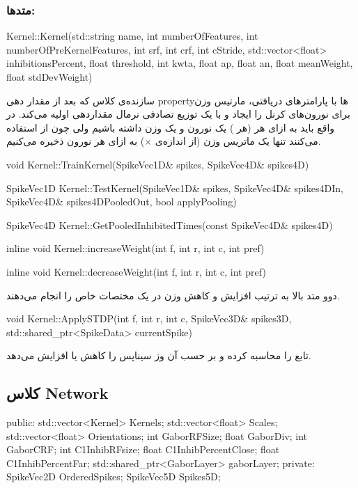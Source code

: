 \subsubsection{متدها:}
\begin{C++source}
Kernel::Kernel(std::string name, int numberOfFeatures, int numberOfPreKernelFeatures, int srf, int crf, int cStride, std::vector<float> inhibitionsPercent, float threshold, int kwta, float ap, float an, float meanWeight, float stdDevWeight)
\end{C++source}

سازنده‌ی کلاس که بعد از مقدار دهی propertyها با پارامتر‌های دریافتی، مارتیس وزن برای نورون‌های کرنل را ایجاد و با یک توزیع تصادفی نرمال مقداردهی اولیه می‌کند. در واقع باید به ازای هر  (هر ) یک نورون و یک وزن داشته باشیم ولی چون از  استفاده می‌کنند تنها یک ماتریس وزن (از اندازه‌ی $\times$) به ازای هر نورون ذخیره می‌کنیم. 

\begin{C++source}
void Kernel::TrainKernel(SpikeVec1D& spikes, SpikeVec4D& spikes4D)
\end{C++source}

\begin{C++source}
SpikeVec1D Kernel::TestKernel(SpikeVec1D& spikes, SpikeVec4D& spikes4DIn, SpikeVec4D& spikes4DPooledOut, bool applyPooling)
\end{C++source}

\begin{C++source}
SpikeVec4D Kernel::GetPooledInhibitedTimes(const SpikeVec4D& spikes4D)
\end{C++source}

\begin{C++source}
inline void Kernel::increaseWeight(int f, int r, int c, int pref)
\end{C++source}

\begin{C++source}
inline void Kernel::decreaseWeight(int f, int r, int c, int pref)
\end{C++source}
دوو متد بالا به ترتیب افزایش و کاهش وزن در یک مختصات خاص را انجام می‌دهند.

\begin{C++source}
void Kernel::ApplySTDP(int f, int r, int c, SpikeVec3D& spikes3D, std::shared_ptr<SpikeData> currentSpike)
\end{C++source}
تابع  را محاسبه کرده و بر حسب آن وز سیناپس را کاهش یا افزایش می‌دهد.

\subsection{کلاس Network}
\begin{C++source}
public:
    std::vector<Kernel> Kernels;
    std::vector<float> Scales;
    std::vector<float> Orientations;
    int GaborRFSize;
    float GaborDiv;
    int GaborCRF;
    int C1InhibRFsize;
    float C1InhibPercentClose;
    float C1InhibPercentFar;
    std::shared_ptr<GaborLayer> gaborLayer;
private:
    SpikeVec2D OrderedSpikes;
    SpikeVec5D Spikes5D;
\end{C++source}

